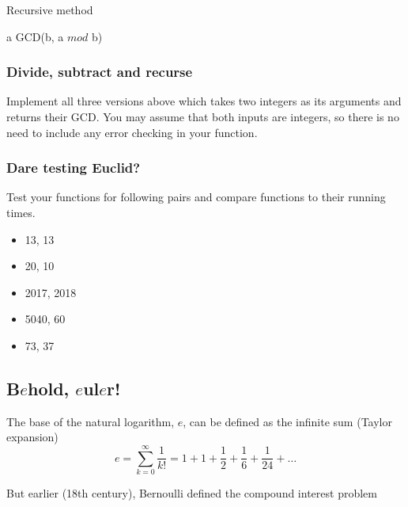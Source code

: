 \documentclass[a4paper]{article}
\begin{document}
\begin{algorithm}
    \caption{Recursive method}
    \begin{algorithmic}[1]
                \State \Return a
            \Else
                \State \Return GCD(b, a $ mod $ b)
            \EndIf
        \EndFunction
    \end{algorithmic}
\end{algorithm}

\subsubsection{Divide, subtract and recurse} Implement all three versions above which takes
two integers as its arguments and returns their GCD. You may assume that both
inputs are integers, so there is no need to include any error checking in your function.

\subsubsection{Dare testing Euclid?} Test your functions for following pairs and compare functions to their running times.

\begin{itemize}
    \item 13, 13
    \item 20, 10
    \item 2017, 2018
    \item 5040, 60
    \item 73, 37
\end{itemize}

\newpage
\subsection{B$e$hold, $e$ul$e$r!}

The base of the natural logarithm, $e$, can be defined as the infinite sum (Taylor expansion)
\begin{equation}
	e = \sum_{k=0}^{\infty}\frac{1}{k!} = 1 + 1 + \frac{1}{2} + \frac{1}{6} + \frac{1}{24} + \dots
	\label{e_sum}
\end{equation}

But earlier (18th century), Bernoulli defined the compound interest problem
\end{document}
